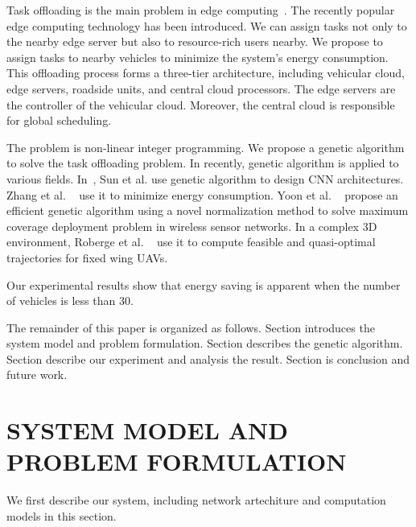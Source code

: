 \documentclass[conference]{IEEEtran}
\begin{document}
	Task offloading is the main problem in edge computing~\cite{yang2020truthful}. The recently popular edge computing technology has been introduced. We can assign tasks not only to the nearby edge server but also to resource-rich users nearby. 
	We propose to assign tasks to nearby vehicles to minimize the system's energy consumption. 
	This offloading process forms a three-tier architecture, including vehicular cloud, edge servers, roadside units, and central cloud processors. 
	The edge servers are the controller of the vehicular cloud. Moreover, the central cloud is responsible for global scheduling. 
	
	The problem is non-linear integer programming. 
	We propose a genetic algorithm to solve the task offloading problem. In recently, genetic algorithm is applied to various fields. In~\cite{sun2020automatically}, Sun et al. use genetic algorithm to design CNN architectures. Zhang et al. ~\cite{zhang2019trade} use it to minimize energy consumption. 
	Yoon et al. ~\cite{GANetwork} propose an efficient genetic algorithm using a novel normalization method to solve maximum coverage deployment problem in wireless sensor networks. 
	In a complex 3D environment, Roberge et al. ~\cite{gapathplan} use it to compute feasible and quasi-optimal trajectories for fixed wing UAVs. %
	
	Our experimental results show that energy saving is apparent when the number of vehicles is less than 30. 
	
	The remainder of this paper is organized as follows. Section \uppercase\expandafter{} introduces the system model and problem formulation. 
	Section \uppercase\expandafter{} describes the genetic algorithm. 
	Section \uppercase\expandafter{}  describe our experiment and analysis the result. 
	Section \uppercase\expandafter{}
	is conclusion and future work. 
	
	\section{SYSTEM MODEL AND PROBLEM FORMULATION}
	We first describe our system, including network artechiture and computation models in this section. 
	
\end{document}
